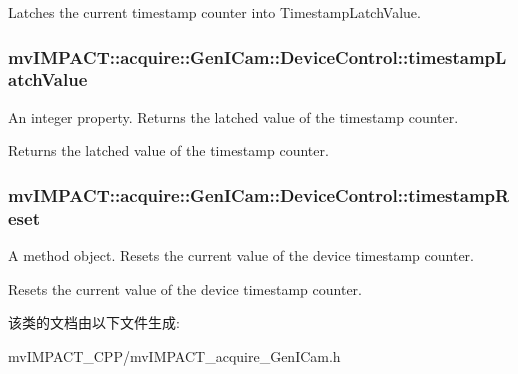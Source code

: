 Latches the current timestamp counter into Timestamp\+Latch\+Value. \hypertarget{classmv_i_m_p_a_c_t_1_1acquire_1_1_gen_i_cam_1_1_device_control_a05c3e26d9ac8eae5af54a267811451eb}{
\subsubsection[{timestamp\+Latch\+Value}]{ mv\+I\+M\+P\+A\+C\+T\+::acquire\+::\+Gen\+I\+Cam\+::\+Device\+Control\+::timestamp\+Latch\+Value}}\label{classmv_i_m_p_a_c_t_1_1acquire_1_1_gen_i_cam_1_1_device_control_a05c3e26d9ac8eae5af54a267811451eb}


An integer property. Returns the latched value of the timestamp counter. 

Returns the latched value of the timestamp counter. \hypertarget{classmv_i_m_p_a_c_t_1_1acquire_1_1_gen_i_cam_1_1_device_control_a10806972cf9d8272b34769de825db3d4}{
\subsubsection[{timestamp\+Reset}]{ mv\+I\+M\+P\+A\+C\+T\+::acquire\+::\+Gen\+I\+Cam\+::\+Device\+Control\+::timestamp\+Reset}}\label{classmv_i_m_p_a_c_t_1_1acquire_1_1_gen_i_cam_1_1_device_control_a10806972cf9d8272b34769de825db3d4}


A method object. Resets the current value of the device timestamp counter. 

Resets the current value of the device timestamp counter. 

该类的文档由以下文件生成\+:\begin{DoxyCompactItemize}
\item 
mv\+I\+M\+P\+A\+C\+T\+\_\+\+C\+P\+P/mv\+I\+M\+P\+A\+C\+T\+\_\+acquire\+\_\+\+Gen\+I\+Cam.\+h\end{DoxyCompactItemize}

